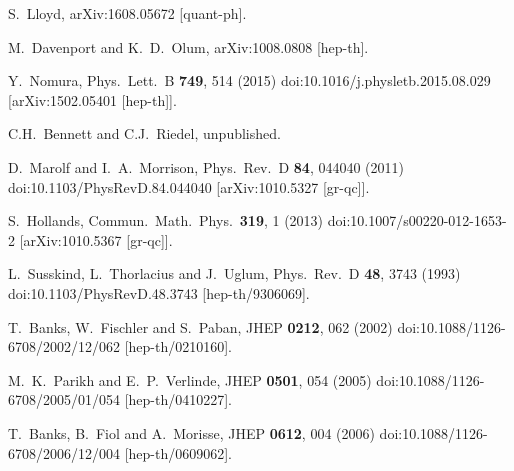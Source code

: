\documentclass[12pt,letterpaper]{article}
\begin{document}
\begin{thebibliography}{999}
  S.~Lloyd,
  arXiv:1608.05672 [quant-ph].

  M.~Davenport and K.~D.~Olum,
  arXiv:1008.0808 [hep-th].
  
  Y.~Nomura,
  Phys.\ Lett.\ B {\bf 749}, 514 (2015)
  doi:10.1016/j.physletb.2015.08.029
  [arXiv:1502.05401 [hep-th]].

C.H.~Bennett and C.J.~Riedel, unpublished.

  D.~Marolf and I.~A.~Morrison,
  Phys.\ Rev.\ D {\bf 84}, 044040 (2011)
  doi:10.1103/PhysRevD.84.044040
  [arXiv:1010.5327 [gr-qc]].
 
  S.~Hollands,
  Commun.\ Math.\ Phys.\  {\bf 319}, 1 (2013)
  doi:10.1007/s00220-012-1653-2
  [arXiv:1010.5367 [gr-qc]].

  L.~Susskind, L.~Thorlacius and J.~Uglum,
  Phys.\ Rev.\ D {\bf 48}, 3743 (1993)
  doi:10.1103/PhysRevD.48.3743
  [hep-th/9306069].
 
  T.~Banks, W.~Fischler and S.~Paban,
  JHEP {\bf 0212}, 062 (2002)
  doi:10.1088/1126-6708/2002/12/062
  [hep-th/0210160].
 
  M.~K.~Parikh and E.~P.~Verlinde,
  JHEP {\bf 0501}, 054 (2005)
  doi:10.1088/1126-6708/2005/01/054
  [hep-th/0410227].
  
  T.~Banks, B.~Fiol and A.~Morisse,
  JHEP {\bf 0612}, 004 (2006)
  doi:10.1088/1126-6708/2006/12/004
  [hep-th/0609062].


\end{thebibliography}
\end{document}
